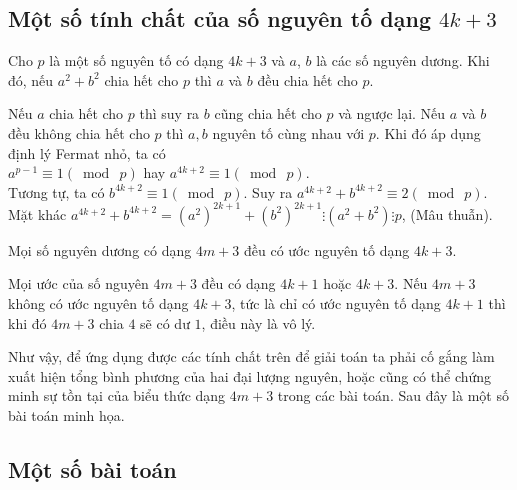 \subsection{Một số tính chất của số nguyên tố dạng $4k+3$} 
\begin{tc}
	Cho $p$ là một số nguyên tố có dạng $4k+3$ và $a$, $b$ là các số nguyên dương. Khi đó, nếu $a^2+b^2$ chia hết cho $p$ thì $a$ và $b$ đều chia hết cho $p$.
\end{tc}
\begin{cm}
	Nếu $a$ chia hết cho $p$ thì suy ra $b$ cũng chia hết cho $p$ và ngược lại. Nếu $a$ và $b$ đều không chia hết cho $p$ thì $a, b$ nguyên tố cùng nhau với $p$. Khi đó áp dụng định lý Fermat nhỏ, ta có\\
	$a^{p-1}\equiv 1(\bmod \ p)$ hay $a^{4k+2}\equiv 1 (\bmod \ p)$.\\
	Tương tự, ta có $b^{4k+2}\equiv 1 (\bmod \ p)$.	Suy ra $a^{4k+2}+b^{4k+2} \equiv 2 (\bmod \ p)$.\\
	Mặt khác $a^{4k+2}+b^{4k+2} =(a^2)^{2k+1}+(b^2)^{2k+1} \vdots (a^2+b^2) \vdots p$, (Mâu thuẫn).
\end{cm}
\begin{tc}
	Mọi số nguyên dương có dạng $4m+3$ đều có ước nguyên tố dạng $4k+3$.
\end{tc}
\begin{cm}
	Mọi ước của số nguyên $4m+3$ đều có dạng $4k+1$ hoặc $4k+3$. Nếu $4m+3$ không có ước nguyên tố dạng $4k+3$, tức là chỉ có ước nguyên tố dạng $4k+1$ thì khi đó $4m+3$ chia $4$ sẽ có dư $1$, điều này là vô lý.
\end{cm}
Như vậy, để ứng dụng được các tính chất trên để giải toán ta phải cố gắng làm xuất hiện tổng bình phương của hai đại lượng nguyên, hoặc cũng có thể chứng minh sự tồn tại của biểu thức dạng $4m+3$ trong các bài toán. Sau đây là một số bài toán minh họa.
\subsection{Một số bài toán}

